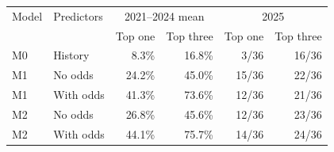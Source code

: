 \begin{tabular}{llrrrr}
\toprule
Model & Predictors & \multicolumn{2}{c}{2021--2024 mean} & \multicolumn{2}{c}{2025} \\ 
 & & Top one & Top three & Top one & Top three \\
\midrule
M0 & History & 8.3\% & 16.8\% & 3/36 & 16/36 \\
M1 & No odds & 24.2\% & 45.0\% & 15/36 & 22/36 \\
M1 & With odds & 41.3\% & 73.6\% & 12/36 & 21/36 \\
M2 & No odds & 26.8\% & 45.6\% & 12/36 & 23/36 \\
M2 & With odds & 44.1\% & 75.7\% & 14/36 & 24/36 \\
\bottomrule
\end{tabular}
